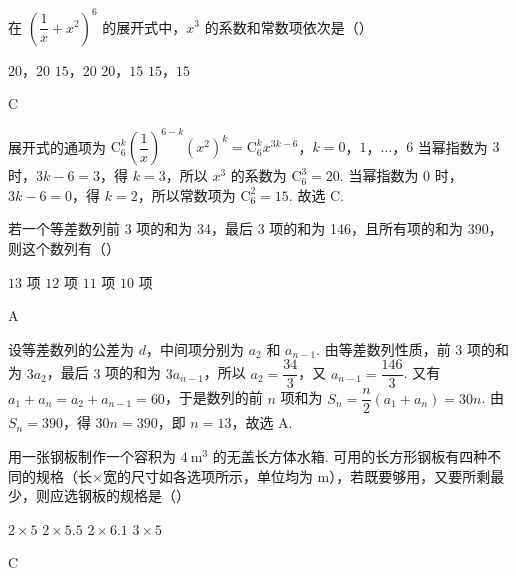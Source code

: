 \begin{problem}
在 \(\left(\dfrac{1}{x}+x^{2}\right)^{6}\) 的展开式中，\(x^{3}\) 的系数和常数项依次是（\quad）

\choices
    {\(20\)，\(20\)}
    {\(15\)，\(20\)}
    {\(20\)，\(15\)}
    {\(15\)，\(15\)}
\end{problem}

\begin{answer}
C
\end{answer}

\begin{solution}
展开式的通项为
\(\mathrm C_{6}^{k}\left(\dfrac{1}{x}\right)^{6-k}(x^{2})^{k}=\mathrm C_{6}^{k}x^{3k-6}\)，\(k=0\)，\(1\)，\(\ldots\)，\(6\)
当幂指数为 \(3\) 时，\(3k-6=3\)，得 \(k=3\)，所以 \(x^{3}\) 的系数为 \(\mathrm C_{6}^{3}=20\). 当幂指数为 \(0\) 时，\(3k-6=0\)，得 \(k=2\)，所以常数项为 \(\mathrm C_{6}^{2}=15\). 故选 C.
\end{solution}

\begin{problem}
若一个等差数列前 3 项的和为 34，最后 3 项的和为 146，且所有项的和为 390，则这个数列有（\quad）

\choices
    {\(13\text{ 项}\)}
    {\(12\text{ 项}\)}
    {\(11\text{ 项}\)}
    {\(10\text{ 项}\)}
\end{problem}

\begin{answer}
A
\end{answer}

\begin{solution}
设等差数列的公差为 \(d\)，中间项分别为 \(a_{2}\) 和 \(a_{n-1}\). 由等差数列性质，前 \(3\) 项的和为 \(3a_{2}\)，最后 \(3\) 项的和为 \(3a_{n-1}\)，所以
\(a_{2}=\dfrac{34}{3}\)，又 \(a_{n-1}=\dfrac{146}{3}\). 又有 \(a_{1}+a_{n}=a_{2}+a_{n-1}=60\)，于是数列的前 \(n\) 项和为 \(S_{n}=\dfrac{n}{2}\left(a_{1}+a_{n}\right)=30n\).
由 \(S_{n}=390\)，得 \(30n=390\)，即 \(n=13\)，故选 A.
\end{solution}

\begin{problem}
用一张钢板制作一个容积为 \(4\mathrm{~m}^{3}\) 的无盖长方体水箱. 可用的长方形钢板有四种不同的规格（长\(\times\)宽的尺寸如各选项所示，单位均为 \(\mathrm{m}\)），若既要够用，又要所剩最少，则应选钢板的规格是（\quad）

\choices
    {\(2\times5\)}
    {\(2\times5.5\)}
    {\(2\times6.1\)}
    {\(3\times5\)}
\end{problem}

\begin{answer}
C
\end{answer}

